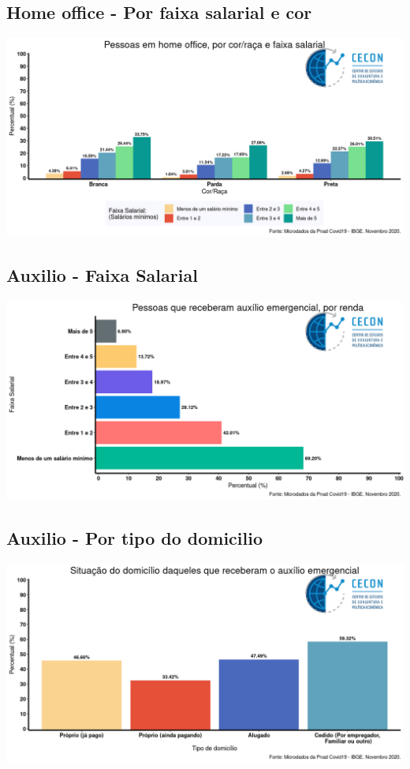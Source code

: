 \documentclass{SelfArx}
\begin{document}
\subsection*{Home office - Por faixa salarial e cor}
\label{sec:org5ef8463}
\begin{center}
\includegraphics[width=.9\linewidth]{./figs/PNAD_COVID/home_renda.png}
\end{center}
\subsection*{Auxilio - Faixa Salarial}
\label{sec:org15d7f19}
\begin{center}
\includegraphics[width=.9\linewidth]{./figs/PNAD_COVID/auxilio_renda.png}
\end{center}
\subsection*{Auxilio - Por tipo do domicilio}
\label{sec:orgeefed92}
\begin{center}
\includegraphics[width=.9\linewidth]{./figs/PNAD_COVID/auxilio_domicilio.png}
\end{center}
\end{document}
